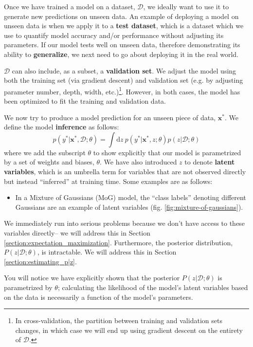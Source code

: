 \documentclass[]{article}
\begin{document}
Once we have trained a model on a dataset, $\mathcal{D}$, we ideally want to use it to generate new predictions on unseen data. An example of deploying a model on unseen data is when we apply it to a \textbf{test dataset}, which is a dataset which we use to quantify model accuracy and/or performance without adjusting its parameters. If our model tests well on unseen data, therefore demonstrating its ability to \textbf{generalize}, we next need to go about deploying it in the real world.

$\mathcal{D}$ can also include, as a subset, a \textbf{validation set}. We adjust the model using both the training set (via gradient descent) and validation set (e.g. by adjusting parameter number, depth, width, etc.)\footnote{In cross-validation, the partition between training and validation sets changes, in which case we will end up using gradient descent on the entirety of $\mathcal{D}$.}. However, in both cases, the model has been optimized to fit the training and validation data.

We now try to produce a model prediction for an unseen piece of data, $\textbf{x}^*$. We define the model \textbf{inference} as follows:
\begin{equation}\label{eq:inference}
    p(y^* |\textbf{x}^*, \mathcal{D};\theta) = \int \text{d}z~p(y^*|\textbf{x}^*, z;\theta)p(z|\mathcal{D};\theta)
\end{equation}
where we add the subscript $\theta$ to show explicitly that our model is parametrized by a set of weights and biases, $\theta$. We have also introduced $z$ to denote \textbf{latent variables}, which is an umbrella term for variables that are not observed directly but instead ``inferred'' at training time. Some examples are as follows:
\begin{itemize}
    \item In a Mixture of Gaussians (MoG) model, the ``class labels'' denoting different Gaussians are an example of latent variables (fig. \ref{fig:mixture-of-gaussians}).
\end{itemize}

We immediately run into serious problems because we don't have access to these variables directly-- we will address this in Section \ref{section:expectation_maximization}. Furthermore, the posterior distribution, $P(z|\mathcal{D} ;\theta)$, is intractable. We will address this in Section \ref{section:estimating_p|z}.

You will notice we have explicitly shown that the posterior $P(z|\mathcal{D};\theta)$ is parametrized by $\theta$; calculating the likelihood of the model's latent variables based on the data is necessarily a function of the model's parameters.
\end{document}
